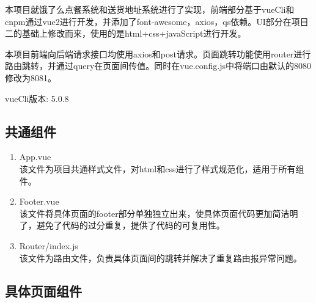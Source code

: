 本项目就饿了么点餐系统和送货地址系统进行了实现，前端部分基于vueCli和cnpm通过vue2进行开发，并添加了font-awesome，axios，qs依赖。UI部分在项目二的基础上修改而来，使用的是html+css+javaScript进行开发。

本项目前端向后端请求接口均使用axios和post请求。页面跳转功能使用router进行路由跳转，并通过query在页面间传值。同时在vue.config.js中将端口由默认的8080修改为8081。

vueCli版本: 5.0.8

\subsection{共通组件}

\begin{enumerate}
  \item App.vue\\
  该文件为项目共通样式文件，对html和css进行了样式规范化，适用于所有组件。

  \item Footer.vue\\
  该文件将具体页面的footer部分单独独立出来，使具体页面代码更加简洁明了，避免了代码的过分重复，提供了代码的可复用性。
  
  \item Router/index.js\\
  该文件为路由文件，负责具体页面间的跳转并解决了重复路由报异常问题。
\end{enumerate}

\subsection{具体页面组件}

